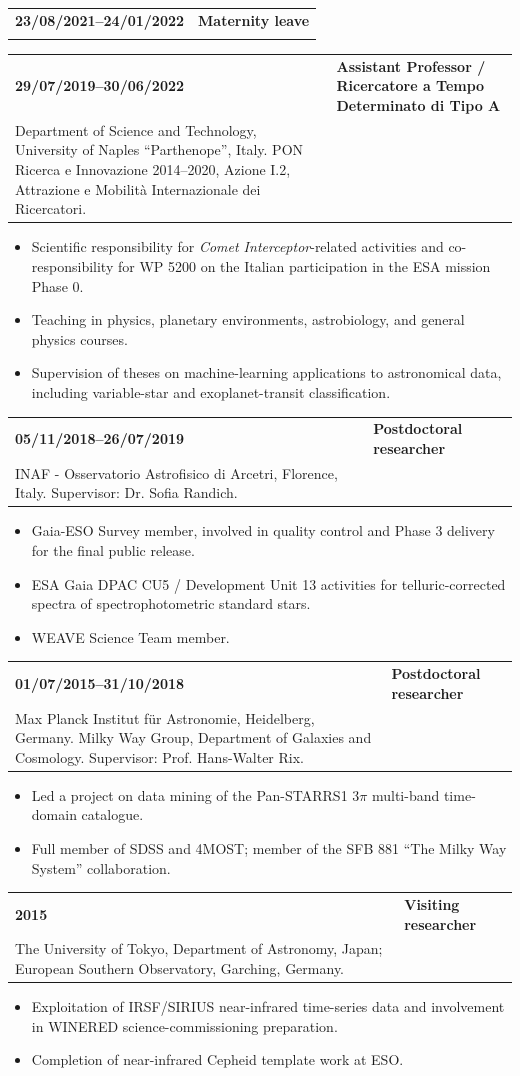 \documentclass[11pt,a4paper]{article}
\makeatletter
\newcommand{\cvitem}[2]{\begin{tabularx}{\textwidth}{@{}p{3.1cm}X@{}}\textbf{#1} & #2 \\ \end{tabularx}}
\newcommand{\role}[3]{\cvitem{#1}{\textbf{#2}\\#3}}
\makeatother
\begin{document}
\role{23/08/2021--24/01/2022}{Maternity leave}{}

\role{29/07/2019--30/06/2022}{Assistant Professor / Ricercatore a Tempo Determinato di Tipo A}{Department of Science and Technology, University of Naples ``Parthenope'', Italy. PON Ricerca e Innovazione 2014--2020, Azione I.2, Attrazione e Mobilit\`a Internazionale dei Ricercatori.}
\begin{itemize}
    \item Scientific responsibility for \textit{Comet Interceptor}-related activities and co-responsibility for WP 5200 on the Italian participation in the ESA mission Phase 0.
    \item Teaching in physics, planetary environments, astrobiology, and general physics courses.
    \item Supervision of theses on machine-learning applications to astronomical data, including variable-star and exoplanet-transit classification.
\end{itemize}

\role{05/11/2018--26/07/2019}{Postdoctoral researcher}{INAF - Osservatorio Astrofisico di Arcetri, Florence, Italy. Supervisor: Dr. Sofia Randich.}
\begin{itemize}
    \item Gaia-ESO Survey member, involved in quality control and Phase 3 delivery for the final public release.
    \item ESA Gaia DPAC CU5 / Development Unit 13 activities for telluric-corrected spectra of spectrophotometric standard stars.
    \item WEAVE Science Team member.
\end{itemize}

\role{01/07/2015--31/10/2018}{Postdoctoral researcher}{Max Planck Institut f\"ur Astronomie, Heidelberg, Germany. Milky Way Group, Department of Galaxies and Cosmology. Supervisor: Prof. Hans-Walter Rix.}
\begin{itemize}
    \item Led a project on data mining of the Pan-STARRS1 3$\pi$ multi-band time-domain catalogue.
    \item Full member of SDSS and 4MOST; member of the SFB 881 ``The Milky Way System'' collaboration.
\end{itemize}

\role{2015}{Visiting researcher}{The University of Tokyo, Department of Astronomy, Japan; European Southern Observatory, Garching, Germany.}
\begin{itemize}
    \item Exploitation of IRSF/SIRIUS near-infrared time-series data and involvement in WINERED science-commissioning preparation.
    \item Completion of near-infrared Cepheid template work at ESO.
\end{itemize}
\end{document}
